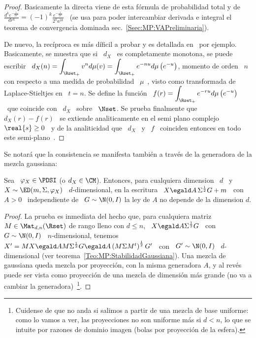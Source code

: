 \begin{proof}
  Basicamente la  directa viene  de esta  f\'ormula de probabilidad  total y  de \
  $\displaystyle     \frac{d^k    e^{-\frac{r}{2    a^2}}}{dr^k}     =    (-1)^k
  \frac{e^{-\frac{r}{2 a^2}}}{2^k  a^{2 k}}$ \  (se usa para  poder intercambiar
  derivada    e     integral    el    teorema     de    convergencia    dominada
  sec.~\ref{Ssec:MP:VAPreliminaria}).

  De  nuevo,  la  rec\'iproca  es  m\'as  d\'ificil  a  probar  y  es  detallada
  en~\cite[\S~12]{Wid46} por ejemplo.  Basicamente, se  muestra que si \ $d_X$ \
  es  completamente  monotona,  se  puede  escribir \  $\displaystyle  d_X(n)  =
  \int_{\Rset_+}  v^n  d\mu(v)  =  \int_{\Rset_+}  e^{-n  u}  d\mu\left(  e^{-u}
  \right)$, momento de  orden \ $n$ con respecto a una  medida de probabilidad \
  $\mu$~\cite{Hau21:I, Hau21:II},  visto como transformada  de Laplace-Stieltjes
  en \ $t  = n$.  Se define la funci\'on \  $\displaystyle f(r) = \int_{\Rset_+}
  e^{- r  u} d\mu\left( e^{-u}  \right)$ \  que coincide con  \ $d_X$ \  sobre \
  $\Nset$.   Se  prueba  finalmente  que   \  $d_X(r)  -  f(r)$  \  se  extiende
  analiticamente  en el  semi  plano  complejo \  $\real{s}  \ge 0$  \  y de  la
  analiticidad  que  \ $d_X$  \  y  \ $f$  \  coinciden  entonces  en todo  este
  semi-plano~\cite{Car21, CarKro05}.
\end{proof}

Se  notar\'a  que  la consistencia  se  manifesta  tambi\'en  a trav\'es  de  la
generadora de la mezcla gaussiana:
%
\begin{lema}\label{Lem:MP:AIndependienteD}
  Sea  \ $\varphi_X  \in  \PDSI$ (o  $d_X  \in \CM$).  Entonces, para  cualquiera
  dimension \ $d$ \ y  $X \sim \ED(m,\Sigma,\varphi_X)$ \ $d$-dimensional, en la
  escritura  \ $X  \egald  A \,  \Sigma^{\frac12} G  +  m$ \  con  \ $A  > 0$  \
  independiente de \ $G  \sim \N(0,I)$ la ley de $A$ no  depende de la dimension
  $d$.
\end{lema}
%
\begin{proof}
  La  prueba  es  inmediata  del   hecho  que,  para  cualquiera  matriz  $M  \in
  \Mat_{d,n}(\Rset)$ de rango lleno con $d  \le n$, \ $X \egald A \Sigma^{\frac12}
  G $ \ con  \ $G \sim \N(0,I)$ \ $n$-dimensional, tenemos $X' =  M X \egald A M
  \Sigma^{\frac12} G \egald A \left( M  \Sigma M^t \right)^{\frac12} G'$ \ con \
  $G'         \sim        \N(0,I)$         \         $d$-dimensional        (ver
  teorema~\ref{Teo:MP:StabilidadGaussiana}).  Una   mezcla  de  gaussiana  queda
  mezcla por proyecci\'on,  con la misma generadora $A$, y  al rev\'es puede ser
  vista como  proyecci\'on de una  mezcla de dimensi\'on  m\'as grande (no  va a
  cambiar la generadora)~\footnote{Cuidense  de que no anda si  salimos a partir
    de una mezcla de base uniforme: como lo vamos a ver, las proyecciones no son
    uniforme m\'as si $d  < n$, lo que se intuite por  razones de dominio imagen
    (bolas por proyecci\'on de la esfera).}.
\end{proof}

